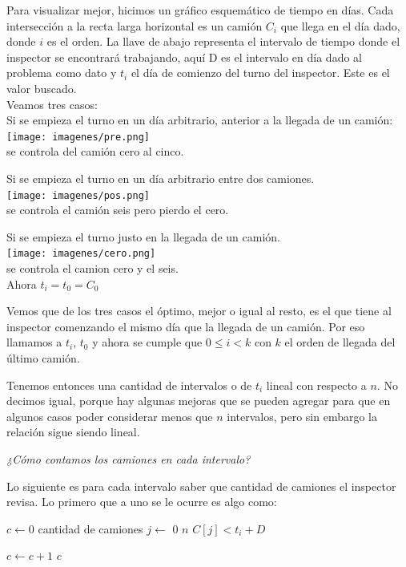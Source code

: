 \documentclass[11pt,a4paper]{article}
\begin{document}
Para visualizar mejor, hicimos un gráfico esquemático de tiempo en días. Cada intersección a la recta larga horizontal es un camión $C_i$ que llega en el día dado, donde $i$ es el orden. La llave de abajo representa el intervalo de tiempo donde el inspector se encontrará trabajando, aquí D es el intervalo en día dado al problema como dato y $t_i$ el día de comienzo del turno del inspector. Este es el valor buscado.\\ Veamos tres casos:\\


Si se empieza el turno en un día arbitrario, anterior a la llegada de un camión:\\
\texttt{[image: imagenes/pre.png]}\\
se controla del camión cero al cinco.

Si se empieza el turno en un día arbitrario entre dos camiones.\\
\texttt{[image: imagenes/pos.png]}\\
se controla el camión seis pero pierdo el cero.

Si se empieza el turno justo en la llegada de un camión.\\
\texttt{[image: imagenes/cero.png]}\\
se controla el camion cero y el seis.\\
Ahora $t_i = t_0 = C_0$

Vemos que de los tres casos el óptimo, mejor o igual al resto, es el que tiene al inspector comenzando el mismo día que la llegada de un camión. Por eso llamamos a $t_i$, $t_0$ y ahora se cumple que $0 \le i < k$ con $k$ el orden de llegada del último camión.

Tenemos entonces una cantidad de intervalos o de $t_i$ lineal con respecto a $n$. No decimos igual, porque hay algunas mejoras que se pueden agregar para que en algunos casos poder considerar menos que $n$ intervalos, pero sin embargo la relación sigue siendo lineal.

\emph{¿Cómo contamos los camiones en cada intervalo?}

Lo siguiente es para cada intervalo saber que cantidad de camiones el inspector revisa. Lo primero que a uno se le ocurre es algo como:

\begin{codebox}
\zi $c \gets 0$
\RComment cantidad de camiones
\zi \For $j \gets$ 0 \To $n$
\zi \Do
\zi   \If $C[j] < t_i + D$ 

\zi
\Then $c \gets c + 1$
\End
\End
\zi
\Return $c$
\end{codebox}
\end{document}
